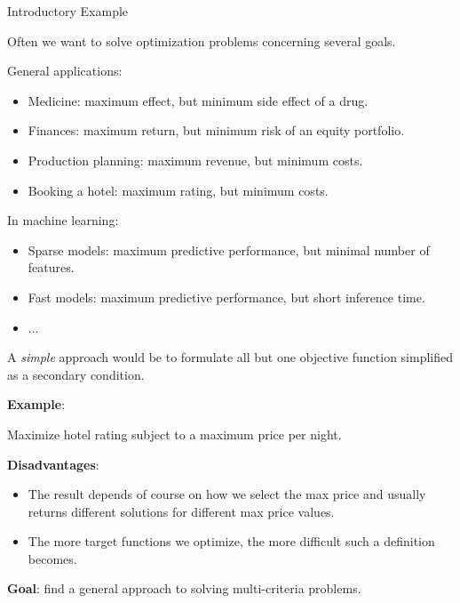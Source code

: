 \begin{frame}[allowframebreaks]{Introductory Example}

Often we want to solve optimization problems concerning several goals.

General applications:
\begin{itemize}
\item Medicine: maximum effect, but minimum side effect of a drug.
\item Finances: maximum return, but minimum risk of an equity portfolio.
\item Production planning: maximum revenue, but minimum costs.
\item Booking a hotel: maximum rating, but minimum costs.
\end{itemize}

In machine learning:
\begin{itemize}
\item Sparse models: maximum predictive performance, but minimal number of features.
\item Fast models: maximum predictive performance, but short inference time.
\item ...
\end{itemize}

A \textit{simple} approach would be to formulate all but one objective function simplified as a secondary condition.

\vspace*{0.2cm}

\framebreak

\textbf{Example}:

Maximize hotel rating subject to a maximum price per night.

\vspace*{0.2cm}

 \textbf{Disadvantages}:
\begin{itemize}
 \item The result depends of course on how we select the max price and usually returns different solutions for different max price values.
 \item The more target functions we optimize, the more difficult such a definition becomes.
\end{itemize}

\vspace*{0.2cm}

\textbf{Goal}: find a general approach to solving multi-criteria problems.



\end{frame}
